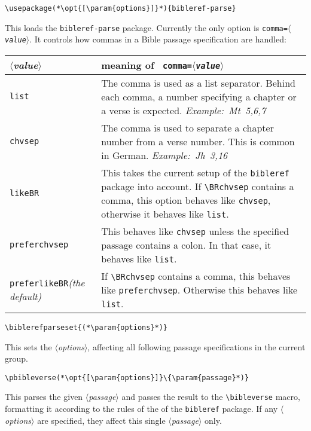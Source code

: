 \documentclass[DIV12,BCOR0mm]{scrartcl}
\newcommand{\thead}[1]{\textbf{\small #1}}
\newcommand{\brp}{\texttt{bibleref-parse}\xspace}
\newcommand{\param}[1]{$\langle${\normalfont\itshape #1\/}$\rangle$}
\newcommand{\opt}[1]{\textcolor{green!50!black}{#1}}
\newcommand{\option}[1]{{\normalfont\texttt{\color{blue!50!black}#1}}}
\begin{document}
\begin{lstlisting}
\usepackage(*\opt{[\param{options}]}*){bibleref-parse}
\end{lstlisting}
This loads the \brp package. Currently the only option is
\option{comma=\param{value}}. It controls how commas in a Bible passage
specification are handled:
\bigskip
\begin{center}
  \begin{tabular}{@{}p{.18\linewidth}p{.78\linewidth}@{}}
    \toprule
    \thead{\param{\bfseries value}}&\thead{meaning of \option{\bfseries
        comma=\param{\bfseries value}}}\\
    \midrule
    \option{list}&The comma is used as a list separator. Behind each
    comma,
    a number specifying a chapter or a verse is expected.
    \hfill\emph{Example:~Mt~5,6,7}
    \\\addlinespace
    \option{chvsep}&The comma is used to separate a chapter number from a
    verse number. This is common in German.
    \hfill\emph{Example:~Jh~3,16}\\\addlinespace
    \option{likeBR}&This takes the current setup of the \texttt{bibleref}
    package into account. If \lstinline|\BRchvsep| contains a comma, this
    option behaves like \option{chvsep}, otherwise it behaves like
    \option{list}.\\\addlinespace
    \option{preferchvsep}&This behaves like \option{chvsep} unless the
    specified passage contains a colon. In that case, it behaves like
    \option{list}.\\\addlinespace
    \option{preferlikeBR}\linebreak\emph{(the default)}&If
    \lstinline|\BRchvsep| contains a comma, this behaves like
    \option{preferchvsep}. Otherwise this behaves like
    \option{list}.\\
    \bottomrule
  \end{tabular}
\end{center}

\begin{lstlisting}
\biblerefparseset{(*\param{options}*)}
\end{lstlisting}
This sets the \param{options}, affecting all following passage specifications in
the current group.

\begin{lstlisting}
\pbibleverse(*\opt{[\param{options}]}\{\param{passage}*)}
\end{lstlisting}
This parses the given \param{passage} and passes the result to the
\lstinline|\bibleverse| macro, formatting it according to the rules of the of
the \texttt{bibleref} package. If any \param{options} are specified, they affect
this single \param{passage} only.
\end{document}

